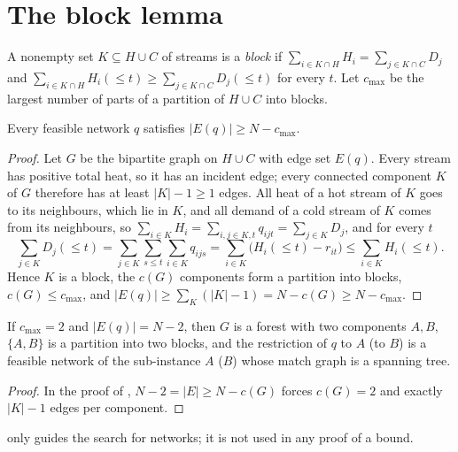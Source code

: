 \documentclass[11pt,a4paper]{report}
\begin{document}
\section{The block lemma}\label{sec:block}

\begin{definition}
A nonempty set $K\subseteq H\cup C$ of streams is a \emph{block} if
$\sum_{i\in K\cap H}H_i=\sum_{j\in K\cap C}D_j$ and $\sum_{i\in K\cap H}H_i({\le}t)\ge\sum_{j\in K\cap C}D_j({\le}t)$
for every $t$. Let $c_{\max}$ be the largest number of parts of a partition of $H\cup C$ into blocks.
\end{definition}

\begin{lemma}\label{lem:block}
Every feasible network $q$ satisfies $|E(q)|\ge N-c_{\max}$.
\end{lemma}
\begin{proof}
Let $G$ be the bipartite graph on $H\cup C$ with edge set $E(q)$. Every stream has positive total heat, so it has an
incident edge; every connected component $K$ of $G$ therefore has at least $|K|-1\ge1$ edges. All heat of a hot
stream of $K$ goes to its neighbours, which lie in $K$, and all demand of a cold stream of $K$ comes from its
neighbours, so $\sum_{i\in K}H_i=\sum_{i,j\in K,t}q_{ijt}=\sum_{j\in K}D_j$, and for every $t$
\[\textstyle\sum_{j\in K}D_j({\le}t)=\sum_{j\in K}\sum_{s\le t}\sum_{i\in K}q_{ijs}
=\sum_{i\in K}\bigl(H_i({\le}t)-r_{it}\bigr)\le\sum_{i\in K}H_i({\le}t).\]
Hence $K$ is a block, the $c(G)$ components form a partition into blocks, $c(G)\le c_{\max}$, and
$|E(q)|\ge\sum_K(|K|-1)=N-c(G)\ge N-c_{\max}$.
\end{proof}

\begin{lemma}\label{lem:structure}
If $c_{\max}=2$ and $|E(q)|=N-2$, then $G$ is a forest with two components $A,B$, $\{A,B\}$ is a partition into two
blocks, and the restriction of $q$ to $A$ (to $B$) is a feasible network of the sub-instance $A$ ($B$) whose match
graph is a spanning tree.
\end{lemma}
\begin{proof}
In the proof of , $N-2=|E|\ge N-c(G)$ forces $c(G)=2$ and exactly $|K|-1$ edges per component.
\end{proof}
 only guides the search for networks; it is not used in any proof of a bound.
\end{document}
